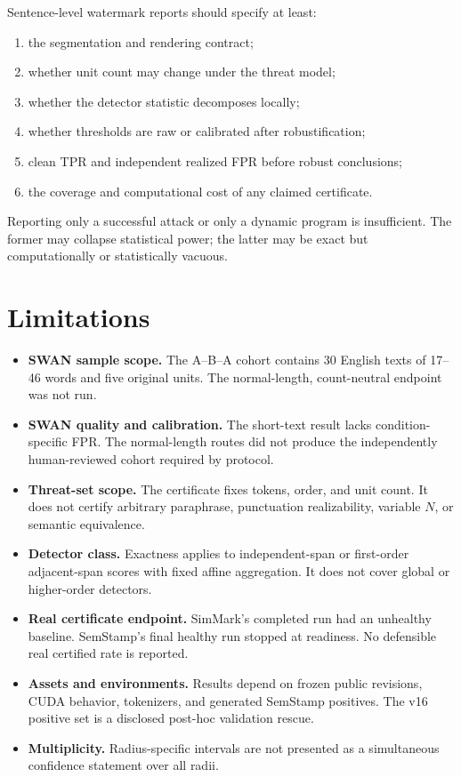 \documentclass[10pt]{article}
\begin{document}
Sentence-level watermark reports should specify at least:

\begin{enumerate}
  \item the segmentation and rendering contract;
  \item whether unit count may change under the threat model;
  \item whether the detector statistic decomposes locally;
  \item whether thresholds are raw or calibrated after robustification;
  \item clean TPR and independent realized FPR before robust conclusions;
  \item the coverage and computational cost of any claimed certificate.
\end{enumerate}

Reporting only a successful attack or only a dynamic program is insufficient.
The former may collapse statistical power; the latter may be exact but
computationally or statistically vacuous.

\section{Limitations}

\begin{itemize}
  \item \textbf{SWAN sample scope.} The A--B--A cohort contains 30 English
  texts of 17--46 words and five original units. The normal-length,
  count-neutral endpoint was not run.
  \item \textbf{SWAN quality and calibration.} The short-text result lacks
  condition-specific FPR. The normal-length routes did not produce the
  independently human-reviewed cohort required by protocol.
  \item \textbf{Threat-set scope.} The certificate fixes tokens, order, and
  unit count. It does not certify arbitrary paraphrase, punctuation
  realizability, variable $N$, or semantic equivalence.
  \item \textbf{Detector class.} Exactness applies to independent-span or
  first-order adjacent-span scores with fixed affine aggregation. It does not
  cover global or higher-order detectors.
  \item \textbf{Real certificate endpoint.} SimMark's completed run had an
  unhealthy baseline. SemStamp's final healthy run stopped at readiness.
  No defensible real certified rate is reported.
  \item \textbf{Assets and environments.} Results depend on frozen public
  revisions, CUDA behavior, tokenizers, and generated SemStamp positives.
  The v16 positive set is a disclosed post-hoc validation rescue.
  \item \textbf{Multiplicity.} Radius-specific intervals are not presented as
  a simultaneous confidence statement over all radii.
\end{itemize}
\end{document}
